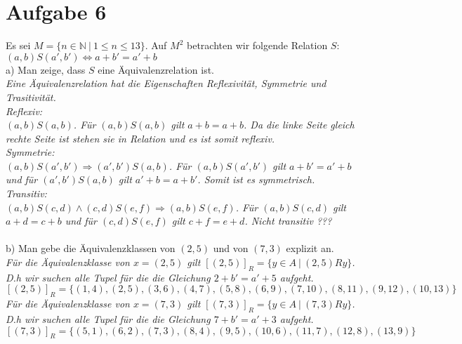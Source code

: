 \section*{Aufgabe 6}

Es sei $M = \{ n \in \mathbb{N} \ | \ 1 \leq n \leq 13 \}$. Auf $M^2$ betrachten wir folgende Relation $S$: $(a,b)S(a',b') \Leftrightarrow a + b' = a' + b$\\

a) Man zeige, dass $S$ eine Äquivalenzrelation ist.\\

\textit{Eine Äquivalenzrelation hat die Eigenschaften Reflexivität, Symmetrie und Trasitivität.}\\

\textit{Reflexiv:}\\
\textit{$(a,b)S(a,b)$. Für $(a,b)S(a,b)$ gilt $a + b = a + b$. Da die linke Seite gleich rechte Seite ist stehen sie in Relation und es ist somit reflexiv.}\\

\textit{Symmetrie:}\\
\textit{$(a,b)S(a',b') \Rightarrow (a',b')S(a,b)$. Für $(a,b)S(a',b')$ gilt $a + b' = a' + b$ und für $(a',b')S(a,b)$ gilt $a' + b = a + b'$. Somit ist es symmetrisch.}\\

\textit{Transitiv:}\\
\textit{$(a,b)S(c,d) \land (c,d)S(e,f) \Rightarrow (a,b)S(e,f)$. Für $(a,b)S(c,d)$ gilt $a + d = c + b$ und für $(c,d)S(e,f)$ gilt $c + f = e + d$. Nicht transitiv ???}\\~\\

b) Man gebe die Äquivalenzklassen von $(2,5)$ und von $(7,3)$ explizit an.\\

\textit{Für die Äquivalenzklasse von $x = (2,5)$ gilt $[(2,5)]_R = \{ y \in A \ | \ (2,5)Ry \}$. D.h wir suchen alle Tupel für die die Gleichung $2 + b' = a' + 5$ aufgeht.}\\

$[(2,5)]_R = \{ (1,4), (2,5), (3,6), (4,7), (5,8), (6,9), (7,10), (8,11), (9,12), (10,13) \}$\\

\textit{Für die Äquivalenzklasse von $x = (7,3)$ gilt $[(7,3)]_R = \{ y \in A \ | \ (7,3)Ry \}$. D.h wir suchen alle Tupel für die die Gleichung $7 + b' = a' + 3$ aufgeht.}\\

$[(7,3)]_R = \{ (5,1), (6,2), (7,3), (8,4), (9,5), (10,6), (11,7), (12,8), (13,9) \}$\\

\newpage